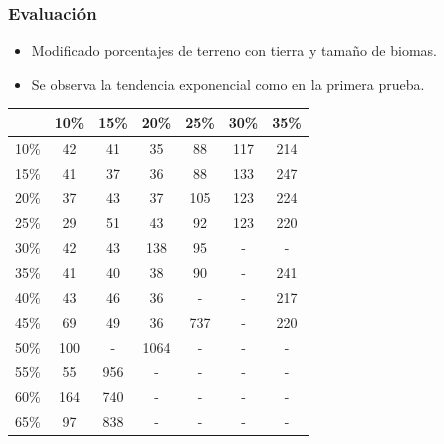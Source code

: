 \begin{frame}
\frametitle{Evaluación}

\begin{itemize}
	\item<1-> Modificado porcentajes de terreno con tierra y tamaño de biomas.
	
	\vspace{0.5em}
	
	\item<2-> Se observa la \textcolor{UDCpink}{tendencia exponencial} como en la primera prueba.
\end{itemize}

\pause[2]

\begin{table}[!h]
	\centering
	\begin{tabular}{c|cccccc}
		& 10\% & 15\% & 20\% & 25\% & 30\% & 35\% \\
		\hline
		10\% & 42 & 41 & 35 & 88 & 117 & 214 \\
		15\% & 41 & 37 & 36 & 88 & 133 & 247 \\
		20\% & 37 & 43 & 37 & 105 & 123 & 224 \\
		25\% & 29 & 51 & 43 & 92 & 123 & 220 \\
		30\% & 42 & 43 & 138 & 95 & - & - \\
		35\% & 41 & 40 & 38 & 90 & - & 241 \\
		40\% & 43 & 46 & 36 & -  & - & 217  \\
		45\% & 69 & 49 & 36 & 737 & - & 220 \\
		50\% & 100 & - & 1064 & - & - & - \\
		55\% & 55 & 956 & - & - & - & - \\
		60\% & 164 & 740 & - & - & - & - \\
		65\% & 97 & 838 & - & - & - & - \\
		\hline
	\end{tabular}
\end{table}

\end{frame}